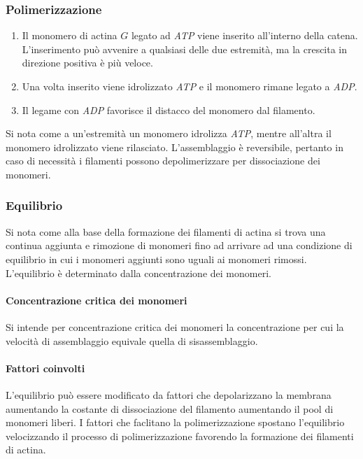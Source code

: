 		\subsubsection{Polimerizzazione}
		\begin{multicols}{2}
			\begin{enumerate}
				\item Il monomero di actina $G$ legato ad \emph{ATP} viene inserito all'interno della catena.
					L'inserimento pu\`o avvenire a qualsiasi delle due estremit\`a, ma la crescita in direzione positiva \`e pi\`u veloce.
				\item Una volta inserito viene idrolizzato \emph{ATP} e il monomero rimane legato a \emph{ADP}.
				\item Il legame con \emph{ADP} favorisce il distacco del monomero dal filamento.
			\end{enumerate}
		\end{multicols}
		Si nota come a un'estremit\`a un monomero idrolizza \emph{ATP}, mentre all'altra il monomero idrolizzato viene rilasciato.
		L'assemblaggio \`e reversibile, pertanto in caso di necessit\`a i filamenti possono depolimerizzare per dissociazione dei monomeri.
		
		\subsubsection{Equilibrio}
		Si nota come alla base della formazione dei filamenti di actina si trova una continua aggiunta e rimozione di monomeri fino ad arrivare ad una condizione di equilibrio in cui i monomeri aggiunti sono uguali ai monomeri rimossi.
		L'equilibrio \`e determinato dalla concentrazione dei monomeri.
			
			\paragraph{Concentrazione critica dei monomeri}
			Si intende per concentrazione critica dei monomeri la concentrazione per cui la velocit\`a di assemblaggio equivale quella di sisassemblaggio.

			\paragraph{Fattori coinvolti}
			L'equilibrio pu\`o essere modificato da fattori che depolarizzano la membrana aumentando la costante di dissociazione del filamento aumentando il pool di monomeri liberi.
			I fattori che faclitano la polimerizzazione spostano l'equilibrio velocizzando il processo di polimerizzazione favorendo la formazione dei filamenti di actina.

